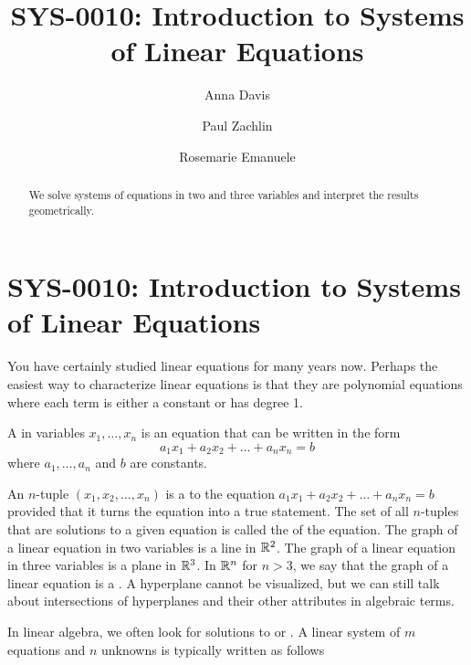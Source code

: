 \documentclass{ximera}
\author{Anna Davis \and Paul Zachlin \and Rosemarie Emanuele} \title{SYS-0010:  Introduction to Systems of Linear Equations} \license{CC-BY 4.0}
\begin{document}
\begin{abstract}
 We solve systems of equations in two and three variables and interpret the results geometrically.
\end{abstract}
\maketitle
\section*{SYS-0010:  Introduction to Systems of Linear Equations}
You have certainly studied linear equations for many years now.  Perhaps the easiest way to characterize linear equations is that they are polynomial equations where each term is either a constant or has degree 1.

\begin{definition}
A  in variables $x_1, \ldots, x_n$ is an equation that can be written in the form
$$a_1x_1+a_2x_2+\ldots +a_nx_n=b$$
where $a_1,\ldots ,a_n$ and $b$ are constants.
\end{definition}




An $n$-tuple $(x_1, x_2,\ldots ,x_n)$ is a  to the equation $a_1x_1+a_2x_2+\ldots +a_nx_n=b$ provided that it turns the equation into a true statement.  The set of all $n$-tuples that are solutions to a given equation is called the  of the equation. The graph of a linear equation in two variables is a line in $\mathbb{R}^2$.  The graph of a linear equation in three variables is a plane in $\mathbb{R}^3$.  In $\mathbb{R}^n$ for $n>3$, we say that the graph of a linear equation is a . A hyperplane cannot be visualized, but we can still talk about intersections of hyperplanes and their other attributes in algebraic terms.  

In linear algebra, we often look for solutions to  or .  
A linear system of $m$ equations and $n$ unknowns is typically written as follows
\end{document}
